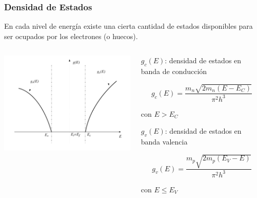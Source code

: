 \documentclass[10pt,t,aspectratio=169]{beamer}
\begin{document}
\begin{frame}[t]
    \frametitle{Densidad de Estados}

    En cada nivel de energía existe una cierta cantidad de estados disponibles para ser ocupados por los electrones (o huecos).

    \begin{columns}
    
        \begin{column}{0.6\textwidth}
        
            \centering
            \includegraphics[width=9cm]{./figures/dos.png} 
            
        \end{column}
        
        \begin{column}{0.4\textwidth}
        
            $g_c(E)$: densidad de estados en banda de conducción

            \[ g_c(E) = \dfrac{m_n\sqrt{2m_n (E-E_C)}}{\pi^2 h^3} \]

            \flushright con $E>E_C$
                
            \flushleft
            $g_v(E)$: densidad de estados en banda valencia

            \[ g_v(E) = \dfrac{m_p\sqrt{2m_p (E_V-E)}}{\pi^2 h^3} \]

            \flushright con $E\leq{}E_V$
            
        \end{column}
        
    \end{columns}
    
\end{frame}
\end{document}
